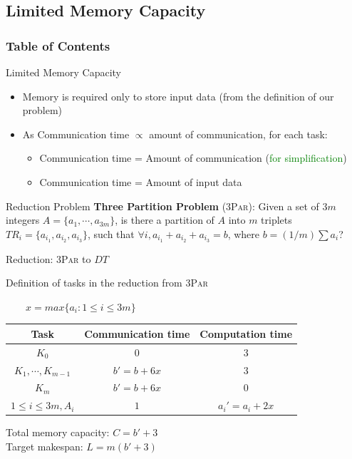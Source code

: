 \documentclass[mathserif,hyperref={pdfpagemode=FullScreen}]{beamer}
\begin{document}
\subsection{Limited Memory Capacity}
\begin{frame}
\frametitle{Table of Contents}
\tableofcontents[currentsubsection]
\end{frame}
\newcommand{\threepart}{\textsc{3Par}\xspace}
\begin{frame}{Limited Memory Capacity}
\begin{itemize}
	\item Memory is required only to store input data (from the definition of our problem)
	\item As Communication time $\propto$ amount of communication, for each task:
	\begin{itemize}
		\item Communication time = Amount of communication  (\textcolor{green}{for simplification})
		\item Communication time = Amount of input data
	\end{itemize}
\end{itemize}

\begin{block}{Reduction Problem}
\textbf{Three Partition Problem} (\threepart): Given a set of
$3m$ integers $A = \{ a_1, \cdots, a_{3m }\}$, is there a partition
of $A$ into $m$ triplets $TR_i = \{a_{i_1}, a_{i_2}, a_{i_3}\}$,
such that $\forall i, a_{i_1} + a_{i_2} + a_{i_3} = b$, where
$b=(1/m) \sum a_i $?
\end{block}
\end{frame}

\begin{frame}{Reduction: \threepart to $DT$ }
\begin{block}{Definition of tasks in the reduction from \threepart}

 $\qquad x = max\{a_i:1\le i\le 3m\}$
\begin{center}
\begin{tabular}{ |c|c|c| }
	\hline
	Task & Communication time & Computation time \\ \hline
	$K_0$ & $0$ & $3$ \\ \hline
	$K_1, \cdots, K_{m-1}$ & $b'=b+6x$ & $3$\\ \hline
	$K_m$ & $b'=b+6x$ & $0$ \\ \hline
	$1\le i \le 3m, A_i$ & $1$ & $a_i' = a_i + 2x$\\ \hline
\end{tabular}
\end{center}
\begin{center}
\noindent Total memory capacity: $C=b'+3$\\
\noindent Target makespan: $L=m(b'+3)$
\end{center}
\end{block}
\end{frame}
\end{document}
